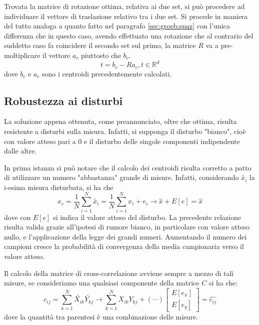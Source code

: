 Trovata la matrice di rotazione ottima, relativa ai due set, si può procedere ad individuare il vettore di traslazione relativo tra i due set. Si procede in maniera del tutto analoga a quanto fatto nel paragrafo \ref{sec:groeb:spaz} con l'unica differenza che in questo caso, avendo effettuato una rotazione che al contrario del suddetto caso fa coincidere il secondo set sul primo, la matrice $R$ va a pre-moltiplicare il vettore $a_c$ piuttosto che $b_c$.
\begin{equation}
	t = b_c - Ra_c, t \in \mathbb{R}^d
\end{equation}
dove $b_c$ e $a_c$ sono i centroidi precedentemente calcolati.
\subsection{Robustezza ai disturbi}
\label{sec:kabsch:rumore}
La soluzione appena ottenuta, come preannunciato, oltre che ottima, risulta resistente a disturbi sulla misura. Infatti, si supponga il disturbo "bianco", cioè con valore atteso pari a 0 e il disturbo delle singole componenti indipendente dalle altre.

In prima istanza si può notare che il calcolo dei centroidi risulta corretto a patto di utilizzare un numero "abbastanza" grande di misure. Infatti, considerando $\tilde{x_i}$ la i-esima misura disturbata, si ha che
\begin{equation}
	x_c = \frac{1}{N}\sum_{i = 1}^{N} \tilde{x_i} = \frac{1}{N}\sum_{i = 1}^{N} x_i + e_i \longrightarrow \hat{x} + E[e] = \hat{x}
\end{equation}
dove con $E[e]$ si indica il valore atteso del disturbo. La precedente relazione risulta valida grazie all'ipotesi di rumore bianco, in particolare con valore atteso nullo, e l'applicazione della legge dei grandi numeri. Aumentando il numero dei campioni cresce la probabilità di convergenza della media campionaria verso il valore atteso.

Il calcolo della matrice di cross-correlazione avviene sempre a mezzo di tali misure, se consideriamo una qualsiasi componente della matrice $C$ si ha che:
\begin{equation}
	c_{ij} = \sum_{k = 1}^{N}  \tilde{X_{ik}} \tilde{Y_{kj}} \longrightarrow \sum_{k = 1}^{N} X_{ik} Y_{kj} + (\cdots) \begin{bmatrix}
	E[e_x] \\
	E[e_y]
	\end{bmatrix} = \hat{c_{ij}}
\end{equation}
dove la quantità tra parentesi è una combinazione delle misure.

